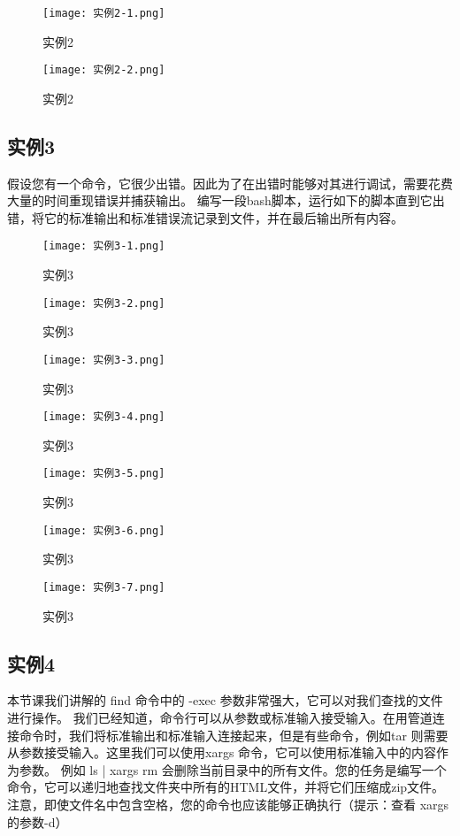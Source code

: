 \documentclass[a4paper, 12pt]{article}
\begin{document}
\begin{figure}[h!]
  \centering
  \texttt{[image: 实例2-1.png]}
  \caption{实例2}
\end{figure}

\begin{figure}[h!]
  \centering
  \texttt{[image: 实例2-2.png]}
  \caption{实例2}
\end{figure}

\subsection{实例3}
假设您有一个命令，它很少出错。因此为了在出错时能够对其进行调试，需要花费大量的时间重现错误并捕获输出。 编写一段bash脚本，运行如下的脚本直到它出错，将它的标准输出和标准错误流记录到文件，并在最后输出所有内容。

\begin{figure}[h!]
  \centering
  \texttt{[image: 实例3-1.png]}
  \caption{实例3}
\end{figure}

\begin{figure}[h!]
  \centering
  \texttt{[image: 实例3-2.png]}
  \caption{实例3}
\end{figure}

\begin{figure}[h!]
  \centering
  \texttt{[image: 实例3-3.png]}
  \caption{实例3}
\end{figure}

\begin{figure}[h!]
  \centering
  \texttt{[image: 实例3-4.png]}
  \caption{实例3}
\end{figure}

\begin{figure}[h!]
  \centering
  \texttt{[image: 实例3-5.png]}
  \caption{实例3}
\end{figure}

\begin{figure}[h!]
  \centering
  \texttt{[image: 实例3-6.png]}
  \caption{实例3}
\end{figure}

\begin{figure}[h!]
  \centering
  \texttt{[image: 实例3-7.png]}
  \caption{实例3}
\end{figure}

\subsection{实例4}
本节课我们讲解的 find 命令中的 -exec 参数非常强大，它可以对我们查找的文件进行操作。 我们已经知道，命令行可以从参数或标准输入接受输入。在用管道连接命令时，我们将标准输出和标准输入连接起来，但是有些命令，例如tar 则需要从参数接受输入。这里我们可以使用xargs 命令，它可以使用标准输入中的内容作为参数。 例如 ls | xargs rm 会删除当前目录中的所有文件。您的任务是编写一个命令，它可以递归地查找文件夹中所有的HTML文件，并将它们压缩成zip文件。注意，即使文件名中包含空格，您的命令也应该能够正确执行（提示：查看 xargs的参数-d）
\end{document}
